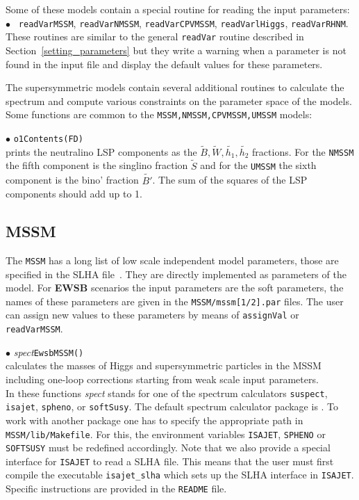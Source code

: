 \documentclass[12pt,a4paper]{article}
\begin{document}
{Some of these models contain a special routine for reading the input parameters:\\
$\bullet$ \verb| readVarMSSM|, \verb|readVarNMSSM|,  \verb|readVarCPVMSSM|,
\verb|readVarlHiggs|, \verb|readVarRHNM|.\\
 These routines  are similar to the general 
\verb|readVar| routine described  in Section~\ref{setting_parameters}
but  they write a warning when a parameter is not found in the 
input file and display the default values for these parameters.

The supersymmetric models contain several additional routines to calculate the spectrum
and compute various constraints on the parameter space of the models. Some functions are
common to the \verb|MSSM,NMSSM,CPVMSSM,UMSSM| models: 


\noindent
$\bullet$  \verb|o1Contents(FD)|\\
prints  the neutralino LSP components as the  $\tilde{B},\tilde{W},
\tilde{h_1},\tilde{h_2}$ fractions. For the {\tt NMSSM} the fifth component is
the singlino fraction  $\tilde{S}$ and for the {\tt UMSSM} the sixth component is
the bino' fraction  $\tilde{B'}$. The sum of the squares of the LSP components
should add up to 1. 



\subsection{MSSM}
The {\tt MSSM} has a long list of low scale  independent model 
parameters, those are specified in the SLHA file~\cite{Skands:2003cj,Allanach:2008qq}.
They are directly implemented as parameters of the model.
For {\bf EWSB} scenarios the input parameters are  the soft parameters, the names 
of these parameters are given in the {\tt MSSM/mssm[1/2].par} files.
The user  can assign new values to these parameters by means of {\tt assignVal}
or {\tt readVarMSSM}.

\noindent $\bullet$ {\it spect}\verb|EwsbMSSM()|\\
 calculates the  masses of Higgs  and
supersymmetric particles in the MSSM including one-loop
corrections starting from weak scale input parameters. \\
In these functions {\it spect} stands for one of
the spectrum calculators {\tt suspect}, {\tt isajet},
{\tt spheno}, or {\tt softSusy}.
The  default spectrum calculator package is {\suspect}. To work
with another package one has to specify the appropriate path in
\verb|MSSM/lib/Makefile|. For this,  the environment variables
\verb|ISAJET|, \verb|SPHENO| or \verb|SOFTSUSY| must be redefined
accordingly. Note that we also provide a special interface for
\verb|ISAJET| to read a SLHA file. This means that the user must
first compile the executable \verb|isajet_slha| which sets up the  SLHA 
interface in  {\tt ISAJET}. Specific instructions are provided in the \verb|README| file.\\
 

}
\end{document}
